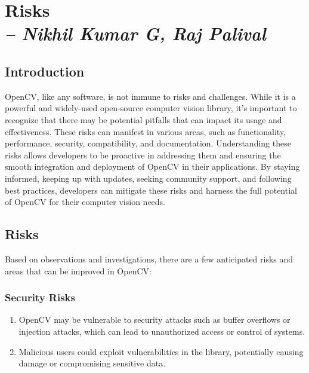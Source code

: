 \chapter{Risks\\
\small{\textit{-- Nikhil Kumar G, Raj Palival}}
\label{Chapter::Risks}}

\section{Introduction \label{Section::RisksChapterIntro}}
OpenCV, like any software, is not immune to risks and challenges. While it is a powerful and widely-used open-source computer vision library, it's important to recognize that there may be potential pitfalls that can impact its usage and effectiveness. These risks can manifest in various areas, such as functionality, performance, security, compatibility, and documentation. Understanding these risks allows developers to be proactive in addressing them and ensuring the smooth integration and deployment of OpenCV in their applications. By staying informed, keeping up with updates, seeking community support, and following best practices, developers can mitigate these risks and harness the full potential of OpenCV for their computer vision needs.

\section{Risks \label{Section::Risks}}
Based on observations and investigations, there are a few anticipated risks and areas that can be improved in OpenCV:

\subsection{Security Risks \label{subSection::SecurityRisk}}
\begin{enumerate}
     \item OpenCV may be vulnerable to security attacks such as buffer overflows or injection attacks, which can lead to unauthorized access or control of systems.
     \item Malicious users could exploit vulnerabilities in the library, potentially causing damage or compromising sensitive data.     
 \end{enumerate}

